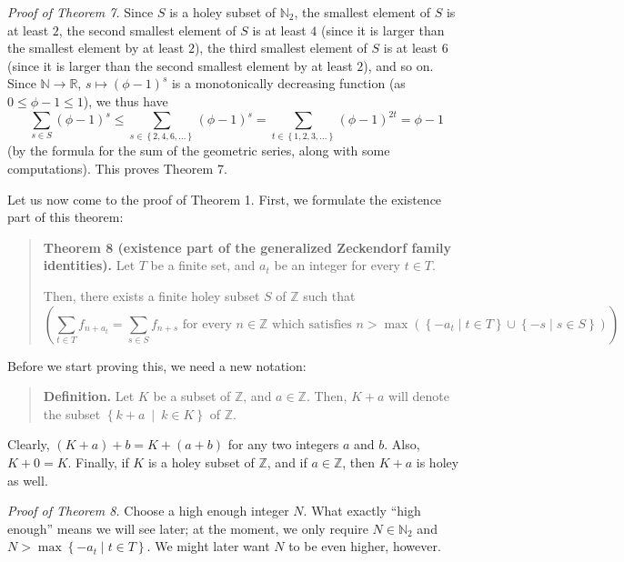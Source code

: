 \documentclass[12pt,final,notitlepage,onecolumn]{article}%
\begin{document}
\textit{Proof of Theorem 7.} Since $S$ is a holey subset of $\mathbb{N}_{2}$,
the smallest element of $S$ is at least $2$, the second smallest element of
$S$ is at least $4$ (since it is larger than the smallest element by at least
$2$), the third smallest element of $S$ is at least $6$ (since it is larger
than the second smallest element by at least $2$), and so on. Since
$\mathbb{N}\rightarrow\mathbb{R}$, $s\mapsto\left(  \phi-1\right)  ^{s}$ is a
monotonically decreasing function (as $0\leq\phi-1\leq1$), we thus have%
\[
\sum_{s\in S}\left(  \phi-1\right)  ^{s}\leq\sum_{s\in\left\{
2,4,6,...\right\}  }\left(  \phi-1\right)  ^{s}=\sum_{t\in\left\{
1,2,3,...\right\}  }\left(  \phi-1\right)  ^{2t}=\phi-1
\]
(by the formula for the sum of the geometric series, along with some
computations). This proves Theorem 7.

Let us now come to the proof of Theorem 1. First, we formulate the existence
part of this theorem:

\begin{quote}
\textbf{Theorem 8 (existence part of the generalized Zeckendorf family
identities).} Let $T$ be a finite set, and $a_{t}$ be an integer for every
$t\in T$.

Then, there exists a finite holey subset $S$ of $\mathbb{Z}$ such that
\[
\left(  \sum\limits_{t\in T}f_{n+a_{t}}=\sum\limits_{s\in S}f_{n+s}\text{ for
every }n\in\mathbb{Z}\text{ which satisfies }n>\max\left(  \left\{  -a_{t}\mid
t\in T\right\}  \cup\left\{  -s\mid s\in S\right\}  \right)  \right)  .
\]



\end{quote}

Before we start proving this, we need a new notation:

\begin{quote}
\textbf{Definition.} Let $K$ be a subset of $\mathbb{Z}$, and $a\in\mathbb{Z}%
$. Then, $K+a$ will denote the subset $\left\{  k+a\ \mid\ k\in K\right\}  $
of $\mathbb{Z}$.
\end{quote}

Clearly, $\left(  K+a\right)  +b=K+\left(  a+b\right)  $ for any two integers
$a$ and $b$. Also, $K+0=K$. Finally, if $K$ is a holey subset of $\mathbb{Z}$,
and if $a\in\mathbb{Z}$, then $K+a$ is holey as well.

\textit{Proof of Theorem 8.} Choose a high enough integer $N$. What exactly
``high enough'' means we will see later; at the moment, we only require
$N\in\mathbb{N}_{2}$ and $N>\max\left\{  -a_{t}\mid t\in T\right\}  $. We
might later want $N$ to be even higher, however.
\end{document}
